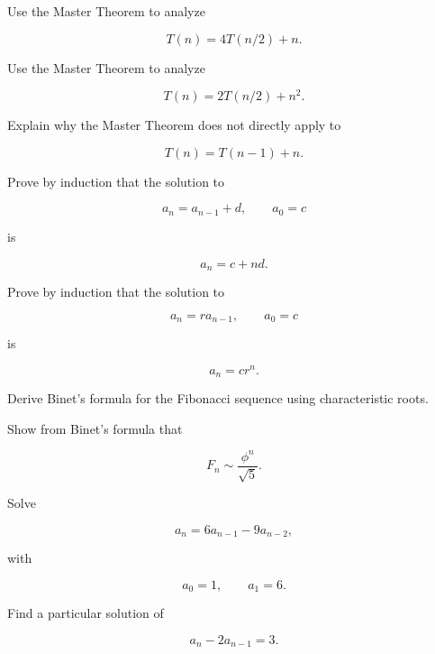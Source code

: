 \begin{exercise}[2]
Use the Master Theorem to analyze

\[
T(n)=4T(n/2)+n.
\]
\end{exercise}

\begin{exercise}[2]
Use the Master Theorem to analyze

\[
T(n)=2T(n/2)+n^2.
\]
\end{exercise}

\begin{exercise}[2]
Explain why the Master Theorem does not directly apply to

\[
T(n)=T(n-1)+n.
\]
\end{exercise}

\begin{exercise}[3]
Prove by induction that the solution to

\[
a_n=a_{n-1}+d,
\qquad
a_0=c
\]

is

\[
a_n=c+nd.
\]
\end{exercise}

\begin{exercise}[3]
Prove by induction that the solution to

\[
a_n=ra_{n-1},
\qquad
a_0=c
\]

is

\[
a_n=cr^n.
\]
\end{exercise}

\begin{exercise}[3]
Derive Binet's formula for the Fibonacci sequence using characteristic
roots.
\end{exercise}

\begin{exercise}[3]
Show from Binet's formula that

\[
F_n
\sim
\frac{\phi^n}{\sqrt5}.
\]
\end{exercise}

\begin{exercise}[3]
Solve

\[
a_n=6a_{n-1}-9a_{n-2},
\]

with

\[
a_0=1,
\qquad
a_1=6.
\]
\end{exercise}

\begin{exercise}[3]
Find a particular solution of

\[
a_n-2a_{n-1}=3.
\]
\end{exercise}


